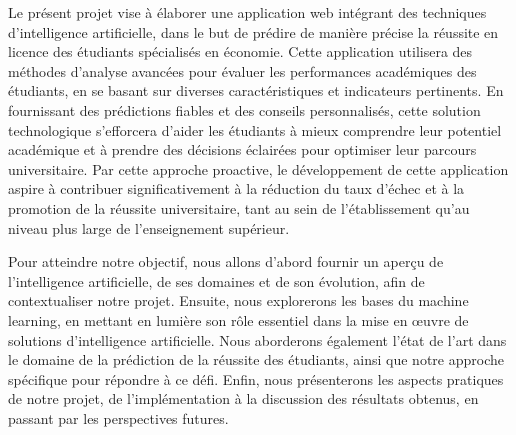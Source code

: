 Le présent projet vise à élaborer une application web intégrant des techniques d'intelligence artificielle, dans le but de prédire de manière précise la réussite en licence des étudiants spécialisés en économie. Cette application utilisera des méthodes d'analyse avancées pour évaluer les performances académiques des étudiants, en se basant sur diverses caractéristiques et indicateurs pertinents. En fournissant des prédictions fiables et des conseils personnalisés, cette solution technologique s'efforcera d'aider les étudiants à mieux comprendre leur potentiel académique et à prendre des décisions éclairées pour optimiser leur parcours universitaire. Par cette approche proactive, le développement de cette application aspire à contribuer significativement à la réduction du taux d'échec et à la promotion de la réussite universitaire, tant au sein de l'établissement qu'au niveau plus large de l'enseignement supérieur.

Pour atteindre notre objectif, nous allons d'abord fournir un aperçu de l'intelligence artificielle, de ses domaines et de son évolution, afin de contextualiser notre projet. Ensuite, nous explorerons les bases du machine learning, en mettant en lumière son rôle essentiel dans la mise en œuvre de solutions d'intelligence artificielle. Nous aborderons également l'état de l'art dans le domaine de la prédiction de la réussite des étudiants, ainsi que notre approche spécifique pour répondre à ce défi. Enfin, nous présenterons les aspects pratiques de notre projet, de l'implémentation à la discussion des résultats obtenus, en passant par les perspectives futures.